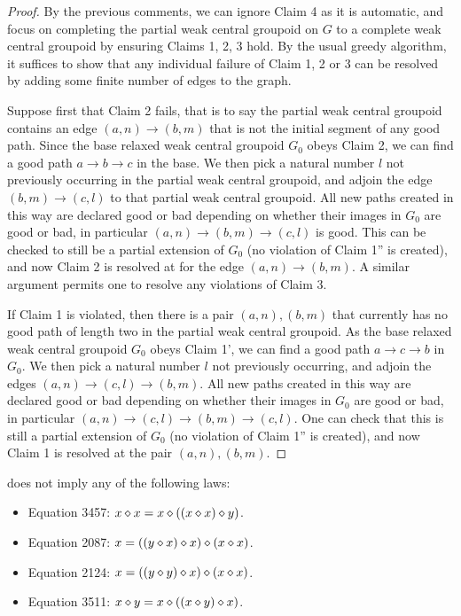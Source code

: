 \begin{proof}  By the previous comments, we can ignore Claim 4 as it is automatic, and focus on completing the partial weak central groupoid on $G$ to a complete weak central groupoid by ensuring Claims 1, 2, 3 hold.  By the usual greedy algorithm, it suffices to show that any individual failure of Claim 1, 2 or 3 can be resolved by adding some finite number of edges to the graph.

  Suppose first that Claim 2 fails, that is to say the partial weak central groupoid contains an edge $(a,n) \to (b,m)$ that is not the initial segment of any good path.  Since the base relaxed weak central groupoid $G_0$ obeys Claim 2, we can find a good path $a \to b \to c$ in the base.  We then pick a natural number $l$ not previously occurring in the partial weak central groupoid, and adjoin the edge $(b,m) \to (c,l)$ to that partial weak central groupoid.  All new paths created in this way are declared good or bad depending on whether their images in $G_0$ are good or bad, in particular $(a,n) \to (b,m) \to (c,l)$ is good.  This can be checked to still be a partial extension of $G_0$ (no violation of Claim 1'' is created), and now Claim 2 is resolved at for the edge $(a,n) \to (b,m)$.  A similar argument permits one to resolve any violations of Claim 3.

If Claim 1 is violated, then there is a pair $(a,n), (b,m)$ that currently has no good path of length two in the partial weak central groupoid.  As the base relaxed weak central groupoid $G_0$ obeys Claim 1', we can find a good path $a \to c \to b$ in $G_0$.  We then pick a natural number $l$ not previously occurring, and adjoin the edges $(a,n) \to (c,l) \to (b,m)$. All new paths created in this way are declared good or bad depending on whether their images in $G_0$ are good or bad, in particular $(a,n) \to (c,l) \to (b,m) \to (c,l)$.  One can check that this is still a partial extension of $G_0$ (no violation of Claim 1'' is created), and now Claim 1 is resolved at the pair $(a,n), (b,m)$.
\end{proof}

\begin{theorem}\label{1485-refutes}\leanok{}
 does not imply any of the following laws:
\begin{itemize}
\item Equation 3457: $x \diamond x = x \diamond ((x \diamond x) \diamond y)$.
\item Equation 2087: $x = ((y \diamond x) \diamond x) \diamond (x \diamond x)$.
\item Equation 2124: $x = ((y \diamond y) \diamond x) \diamond (x \diamond x)$.
\item Equation 3511: $x \diamond y = x \diamond ((x \diamond y) \diamond x)$.
\end{itemize}
\end{theorem}

